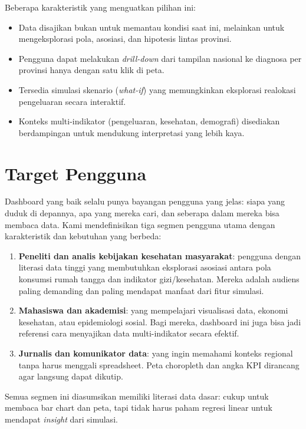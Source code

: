 Beberapa karakteristik yang menguatkan pilihan ini:
\begin{itemize}
  \item Data disajikan bukan untuk memantau kondisi saat ini, melainkan untuk mengeksplorasi pola, asosiasi, dan hipotesis lintas provinsi.
  \item Pengguna dapat melakukan \textit{drill-down} dari tampilan nasional ke diagnosa per provinsi hanya dengan satu klik di peta.
  \item Tersedia simulasi skenario (\textit{what-if}) yang memungkinkan eksplorasi realokasi pengeluaran secara interaktif.
  \item Konteks multi-indikator (pengeluaran, kesehatan, demografi) disediakan berdampingan untuk mendukung interpretasi yang lebih kaya.
\end{itemize}

\section{Target Pengguna}

Dashboard yang baik selalu punya bayangan pengguna yang jelas: siapa yang duduk di depannya, apa yang mereka cari, dan seberapa dalam mereka bisa membaca data. Kami mendefinisikan tiga segmen pengguna utama dengan karakteristik dan kebutuhan yang berbeda:

\begin{enumerate}
  \item \textbf{Peneliti dan analis kebijakan kesehatan masyarakat}: pengguna dengan literasi data tinggi yang membutuhkan eksplorasi asosiasi antara pola konsumsi rumah tangga dan indikator gizi/kesehatan. Mereka adalah audiens paling demanding dan paling mendapat manfaat dari fitur simulasi.
  \item \textbf{Mahasiswa dan akademisi}: yang mempelajari visualisasi data, ekonomi kesehatan, atau epidemiologi sosial. Bagi mereka, dashboard ini juga bisa jadi referensi cara menyajikan data multi-indikator secara efektif.
  \item \textbf{Jurnalis dan komunikator data}: yang ingin memahami konteks regional tanpa harus menggali spreadsheet. Peta choropleth dan angka KPI dirancang agar langsung dapat dikutip.
\end{enumerate}

Semua segmen ini diasumsikan memiliki literasi data dasar: cukup untuk membaca bar chart dan peta, tapi tidak harus paham regresi linear untuk mendapat \textit{insight} dari simulasi.

